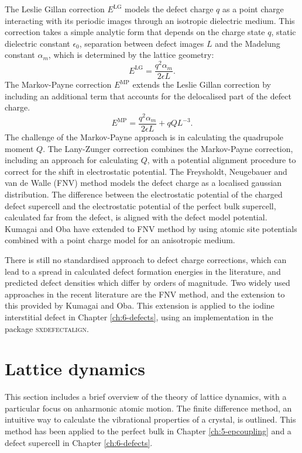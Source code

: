 The Leslie Gillan correction $E^\mathrm{LG}$ models the defect charge $q$ as a point charge interacting with its periodic images through an isotropic dielectric medium.\autocite{Leslie1985}
This correction takes a simple analytic form that depends on the charge state  $q$, static dielectric constant $\epsilon_0$, separation between defect images $L$ and the Madelung constant $\alpha_m$, which is determined by the lattice geometry:
\begin{equation}
    E^\mathrm{LG} = \frac{q^2\alpha_{m}}{2\epsilon L}.
\end{equation}
The Markov-Payne correction $E^\mathrm{MP}$ extends the Leslie Gillan correction by including an additional term that accounts for the delocalised part of the defect charge. 
\begin{equation}
    E^\mathrm{MP} = \frac{q^2\alpha_{m}}{2\epsilon L} + qQL^{-3}. 
\end{equation}
The challenge of the Markov-Payne approach is in calculating the quadrupole moment $Q$. 
The Lany-Zunger correction\autocite{Lany2009} combines the Markov-Payne correction, including an approach for calculating $Q$, with a potential alignment procedure to correct for the shift in electrostatic potential. 
The Freysholdt, Neugebauer and van de Walle (FNV) method\autocite{Freysoldt2009} models the defect charge as a localised gaussian distribution. 
The difference between the electrostatic potential of the charged defect supercell and the electrostatic potential of the perfect bulk supercell, calculated far from the defect, is aligned with the defect model potential. 
Kumagai and Oba have extended to FNV method by using atomic site potentials combined with a point charge model for an anisotropic medium.\autocite{Kumagai2014} 

There is still no standardised approach to defect charge corrections, 
which can lead to a spread in calculated defect formation energies in the literature, and predicted defect densities which differ by orders of magnitude.
Two widely used approaches in the recent literature are the FNV method, and the extension to this provided by Kumagai and Oba.
This extension is applied to the iodine interstitial defect in Chapter \ref{ch:6-defects}, using an implementation in the package \textsc{sxdefectalign}.


\section{Lattice dynamics} \label{sec:latticedynamics}
This section includes a brief overview of the theory of lattice dynamics, with a particular focus on anharmonic atomic motion. The finite difference method, an intuitive way to calculate the vibrational properties of a crystal, is outlined. This method has been applied to the perfect bulk in Chapter \ref{ch:5-epcoupling} and a defect supercell in Chapter \ref{ch:6-defects}.

